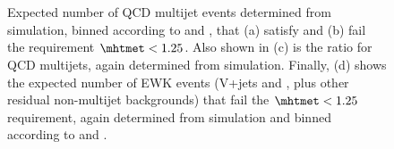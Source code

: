 \begin{figure}[!h]
  \centering
   ~
   \\
   ~ 
   \\
  \caption{Expected number of QCD multijet events determined from
    simulation, binned according to \njet and \scalht, that (a) satisfy
    and (b) fail the requirement $\mhtmet < 1.25$. Also shown in (c)
    is the ratio \rmhtmet for QCD multijets, again determined from
    simulation. Finally, (d) shows the expected number of EWK events
    (V+jets and \ttbar, plus other residual non-multijet backgrounds)
    that fail the $\mhtmet < 1.25$ requirement, again determined from
    simulation and binned according to \njet and \scalht.}
  \label{fig:qcd_plots}
\end{figure}

